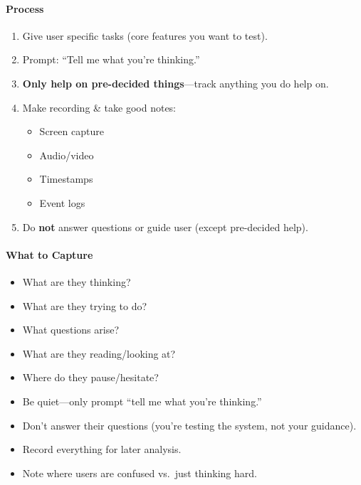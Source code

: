 \paragraph*{Process}
\begin{enumerate}
  \item Give user specific tasks (core features you want to test).
  \item Prompt: ``Tell me what you're thinking.''
  \item \textbf{Only help on pre-decided things}---track anything you do help on.
  \item Make recording \& take good notes:
  \begin{itemize}
    \item Screen capture
    \item Audio/video
    \item Timestamps
    \item Event logs
  \end{itemize}
  \item Do \textbf{not} answer questions or guide user (except pre-decided help).
\end{enumerate}

\paragraph*{What to Capture}
\begin{itemize}
  \item What are they thinking?
  \item What are they trying to do?
  \item What questions arise?
  \item What are they reading/looking at?
  \item Where do they pause/hesitate?
\end{itemize}

\begin{tipbox}
\begin{itemize}
  \item Be quiet---only prompt ``tell me what you're thinking.''
  \item Don't answer their questions (you're testing the system, not your guidance).
  \item Record everything for later analysis.
  \item Note where users are confused vs.\ just thinking hard.
\end{itemize}
\end{tipbox}

